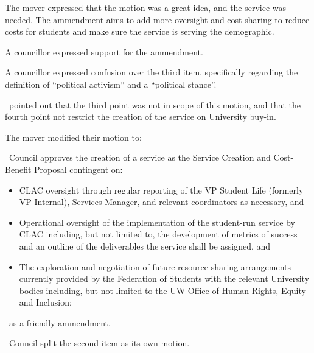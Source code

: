 \begin{motion}
\begin{motion}
        The mover expressed that the motion was a great idea, and the service
        was needed. The ammendment aims to add more oversight and cost sharing
        to reduce costs for students and make sure the service is serving the
        demographic.

        A councillor expressed support for the ammendment.

        A councillor expressed confusion over the third item, specifically 
        regarding the definition of ``political activism'' and a ``political
        stance''.

        \katie\ pointed out that the third point was not in scope of this
        motion, and that the fourth point not restrict the creation of the
        service on University buy-in.

        The mover modified their motion to:

        \begin{motion}
            \birt\ Council approves the creation of a service as the Service Creation
            and Cost-Benefit Proposal contingent on:

            \begin{itemize}
                \item CLAC oversight through regular reporting of the VP Student
                    Life (formerly VP Internal), Services Manager, and relevant
                    coordinators as necessary, and 

                \item Operational oversight of the implementation of the
                    student-run service by CLAC including, but not limited to, the
                    development of metrics of success and an outline of the
                    deliverables the service shall be assigned, and

                \item The exploration and negotiation of future resource sharing
                    arrangements currently provided by the Federation of Students with
                    the relevant University bodies including, but not limited to the UW
                    Office of Human Rights, Equity and Inclusion;

            \end{itemize}

            \carries\ as a friendly ammendment.
        \end{motion}

        \begin{motion}
            \birt\ Council split the second item as its own motion.


\end{motion}
\end{motion}
\end{motion}
